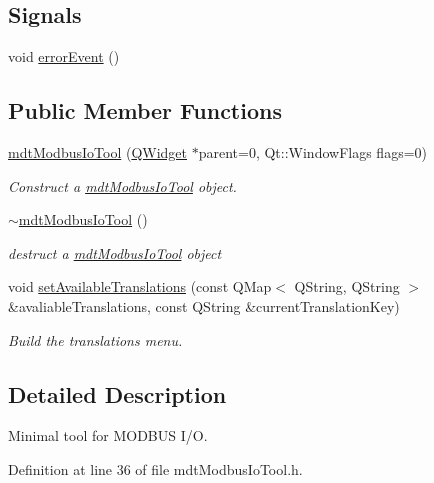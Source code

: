 \subsection*{Signals}
\begin{DoxyCompactItemize}
\item 
void \hyperlink{classmdt_modbus_io_tool_a530eb4396b483076be021689b4fc4a9c}{error\-Event} ()
\end{DoxyCompactItemize}
\subsection*{Public Member Functions}
\begin{DoxyCompactItemize}
\item 
\hyperlink{classmdt_modbus_io_tool_a8ce66aaa36a5e1f5569eaf00f01f28c6}{mdt\-Modbus\-Io\-Tool} (\hyperlink{class_q_widget}{Q\-Widget} $\ast$parent=0, Qt\-::\-Window\-Flags flags=0)
\begin{DoxyCompactList}\small\item\em Construct a \hyperlink{classmdt_modbus_io_tool}{mdt\-Modbus\-Io\-Tool} object. \end{DoxyCompactList}\item 
\hyperlink{classmdt_modbus_io_tool_a4321c2d67a52e135dba99a053ef26547}{$\sim$mdt\-Modbus\-Io\-Tool} ()
\begin{DoxyCompactList}\small\item\em destruct a \hyperlink{classmdt_modbus_io_tool}{mdt\-Modbus\-Io\-Tool} object \end{DoxyCompactList}\item 
void \hyperlink{classmdt_modbus_io_tool_a5609881a00e48c8cbd0047c3c6a15ff5}{set\-Available\-Translations} (const Q\-Map$<$ Q\-String, Q\-String $>$ \&avaliable\-Translations, const Q\-String \&current\-Translation\-Key)
\begin{DoxyCompactList}\small\item\em Build the translations menu. \end{DoxyCompactList}\end{DoxyCompactItemize}


\subsection{Detailed Description}
Minimal tool for M\-O\-D\-B\-U\-S I/\-O. 

Definition at line 36 of file mdt\-Modbus\-Io\-Tool.\-h.



